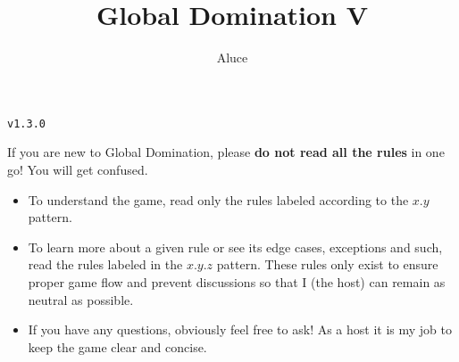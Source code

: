 \documentclass[10pt,openright,a4paper,openany]{article}
\newenvironment{warn}{
	\begin{tcolorbox}[
		colback=purple!5!white,
		colframe=purple!75!black,
	]
}{
	\end{tcolorbox}
}
\begin{document}
\title{Global Domination V}
\author{Aluce}
\maketitle

\begin{center}
\texttt{v1.3.0}
\end{center}

\begin{warn}
	\tcblower 
	If you are new to Global Domination, please \textbf{do not read all the rules} in one go! You will get confused.
	\begin{itemize}
		\item To understand the game, read only the rules labeled according to the $x.y$ pattern.
		\item To learn more about a given rule or see its edge cases, exceptions and such, read the rules labeled in the $x.y.z$ pattern. These rules only exist to ensure proper game flow and prevent discussions so that I (the host) can remain as neutral as possible.
		\item If you have any questions, obviously feel free to ask! As a host it is my job to keep the game clear and concise.
	\end{itemize} 
\end{warn}
\end{document}
